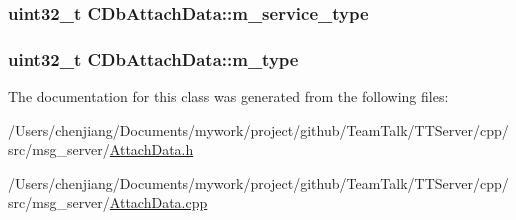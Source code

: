 \subsubsection[{m\+\_\+service\+\_\+type}]{\setlength{\rightskip}{0pt plus 5cm}uint32\+\_\+t C\+Db\+Attach\+Data\+::m\+\_\+service\+\_\+type\hspace{0.3cm}{\ttfamily [private]}}\label{class_c_db_attach_data_aa5ede3c5ce31efb0a6757a09778c5aa3}
\hypertarget{class_c_db_attach_data_a4d7de732ecb1ddd4387e38394348ad24}{}
\subsubsection[{m\+\_\+type}]{\setlength{\rightskip}{0pt plus 5cm}uint32\+\_\+t C\+Db\+Attach\+Data\+::m\+\_\+type\hspace{0.3cm}{\ttfamily [private]}}\label{class_c_db_attach_data_a4d7de732ecb1ddd4387e38394348ad24}


The documentation for this class was generated from the following files\+:\begin{DoxyCompactItemize}
\item 
/\+Users/chenjiang/\+Documents/mywork/project/github/\+Team\+Talk/\+T\+T\+Server/cpp/src/msg\+\_\+server/\hyperlink{_attach_data_8h}{Attach\+Data.\+h}\item 
/\+Users/chenjiang/\+Documents/mywork/project/github/\+Team\+Talk/\+T\+T\+Server/cpp/src/msg\+\_\+server/\hyperlink{_attach_data_8cpp}{Attach\+Data.\+cpp}\end{DoxyCompactItemize}
